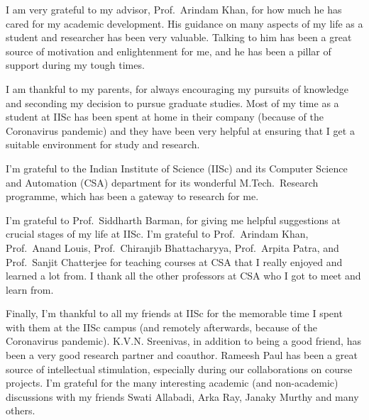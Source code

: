 
I am very grateful to my advisor, Prof.~Arindam Khan,
for how much he has cared for my academic development.
His guidance on many aspects of my life as a student and researcher has been very valuable.
Talking to him has been a great source of motivation and enlightenment for me,
and he has been a pillar of support during my tough times.

I am thankful to my parents, for always encouraging my pursuits of knowledge
and seconding my decision to pursue graduate studies.
Most of my time as a student at IISc has been spent at home in their company
(because of the Coronavirus pandemic) and they have been very helpful
at ensuring that I get a suitable environment for study and research.

I'm grateful to the Indian Institute of Science (IISc)
and its Computer Science and Automation (CSA) department
for its wonderful M.Tech.~Research programme,
which has been a gateway to research for me.

I'm grateful to Prof.~Siddharth Barman, for giving me helpful suggestions
at crucial stages of my life at IISc.
I'm grateful to Prof.~Arindam Khan, Prof.~Anand Louis, Prof.~Chiranjib Bhattacharyya,
Prof.~Arpita Patra, and Prof.~Sanjit Chatterjee for teaching courses at CSA
that I really enjoyed and learned a lot from.
I thank all the other professors at CSA who I got to meet and learn from.

Finally, I'm thankful to all my friends at IISc for the memorable time I spent with them
at the IISc campus (and remotely afterwards, because of the Coronavirus pandemic).
K.V.N. Sreenivas, in addition to being a good friend,
has been a very good research partner and coauthor.
Rameesh Paul has been a great source of intellectual stimulation,
especially during our collaborations on course projects.
I'm grateful for the many interesting academic (and non-academic) discussions with
my friends Swati Allabadi, Arka Ray, Janaky Murthy and many others.
